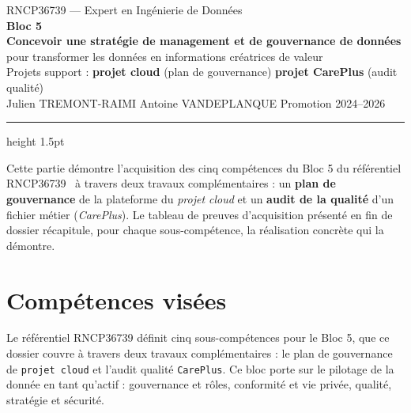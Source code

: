 \documentclass[11pt]{article}
\begin{document}
\thispagestyle{fancy}
\begin{center}
  \vspace*{0.3cm}
  {\small\textcolor{black!55}{RNCP36739 --- Expert en Ingénierie de Données}}\\[6pt]
  {\Huge\bfseries\textcolor{titleNavy}{Bloc 5}}\\[6pt]
  {\large\bfseries Concevoir une stratégie de management et de gouvernance de données}\\[2pt]
  {\large pour transformer les données en informations créatrices de valeur}\\[10pt]
  {\normalsize Projets support : \textbf{projet cloud} (plan de gouvernance) \quad\textbullet\quad \textbf{projet CarePlus} (audit qualité)}\\[4pt]
  {\small Julien TREMONT-RAIMI \quad\textbullet\quad Antoine VANDEPLANQUE \quad\textbullet\quad Promotion 2024--2026}
\end{center}

\vspace{4pt}
{\color{titleNavy}\hrule height 1.5pt}
\vspace{10pt}

Cette partie démontre l'acquisition des cinq compétences du Bloc 5 du référentiel
RNCP36739~\cite{rncp} à travers deux travaux complémentaires : un \textbf{plan de
gouvernance} de la plateforme du \textit{projet cloud} et un \textbf{audit de
la qualité} d'un fichier métier (\textit{CarePlus}). Le tableau de preuves
d'acquisition présenté en fin de dossier récapitule, pour chaque sous-compétence, la
réalisation concrète qui la démontre.

\section{Compétences visées}

Le référentiel RNCP36739 définit cinq sous-compétences pour le Bloc 5, que ce dossier
couvre à travers deux travaux complémentaires : le plan de gouvernance de
\texttt{projet cloud} et l'audit qualité \texttt{CarePlus}. Ce bloc porte sur le
pilotage de la donnée en tant qu'actif : gouvernance et rôles, conformité et vie
privée, qualité, stratégie et sécurité.
\end{document}
